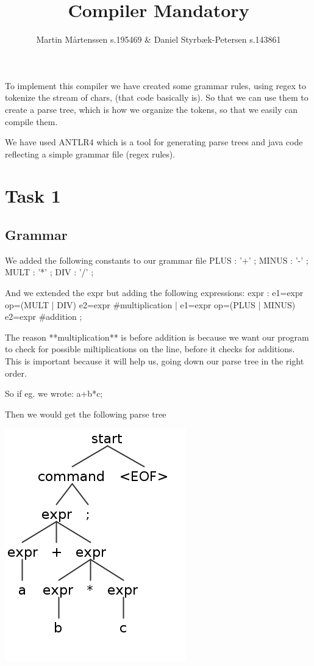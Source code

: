 \documentclass[a4paper]{article}
\title{Compiler Mandatory}
\author{Martin Mårtenssen s.195469 \& Daniel Styrbæk-Petersen s.143861}
\newenvironment{code}%
   {\snugshade\verbatim}%
   {\endverbatim\endsnugshade}
\begin{document}
\maketitle
To implement this compiler we have created some grammar rules, using regex to tokenize the stream of chars, (that code basically is). So that we can use them to create a parse tree, which is how we organize the tokens, so that we easily can compile them.

We have used ANTLR4 which is a tool for generating parse trees and java code reflecting a simple grammar file (regex rules).


\section{ Task 1}

\subsection{Grammar}
We added the following constants to our grammar file
\begin{code}
PLUS  : '+'   ;
MINUS : '-'   ;
MULT  : '*'   ;
DIV   : '/'   ;
\end{code}

And we extended the expr but adding the following expressions:
\begin{code}
expr
  : e1=expr op=(MULT | DIV) e2=expr       #multiplication
  | e1=expr op=(PLUS | MINUS) e2=expr     #addition
  ;
\end{code}

The reason **multiplication** is before addition is because we want our program to check for possible miltiplications on the line, before it checks for additions. This is important because it will help us, going down our parse tree in the right order.

So if eg. we wrote:
\begin{code}
a+b*c;
\end{code}

Then we would get the following parse tree

\begin{center}
  \includegraphics[width=.3\textwidth]{task1.png}
\end{center}
\end{document}
